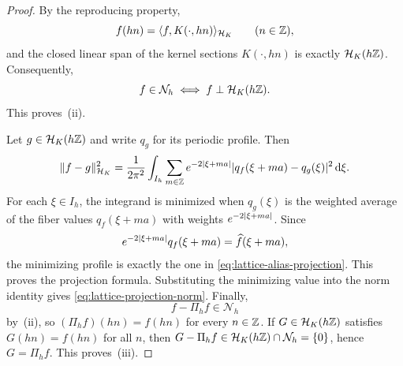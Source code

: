 \begin{proof}
By the reproducing property,
\[
f(hn)=\langle f,K(\cdot,hn)\rangle_{\mathcal H_K}
\qquad(n\in\mathbb{Z}),
\]
and the closed linear span of the kernel sections $K(\cdot,hn)$ is
exactly $\mathcal H_K(h\mathbb{Z})$.  Consequently,
\[
f\in\mathcal N_h
\iff
f\perp\mathcal H_K(h\mathbb{Z}).
\]
This proves~(ii).

Let $g\in\mathcal H_K(h\mathbb{Z})$ and write $q_g$ for its periodic profile.
Then
\[
\|f-g\|_{\mathcal H_K}^2
=\frac{1}{2\pi^2}\int_{I_h}
\sum_{m\in\mathbb{Z}}e^{-2\lvert \xi+ma\rvert}
\lvert q_f(\xi+ma)-q_g(\xi)\rvert^2\,\mathrm{d}\xi.
\]
For each $\xi\in I_h$, the integrand is minimized when $q_g(\xi)$ is the
weighted average of the fiber values $q_f(\xi+ma)$ with weights
$e^{-2\lvert \xi+ma\rvert}$.  Since
\[
e^{-2\lvert \xi+ma\rvert}q_f(\xi+ma)=\widehat f(\xi+ma),
\]
the minimizing profile is exactly the one in
\eqref{eq:lattice-alias-projection}.  This proves the projection formula.
Substituting the minimizing value into the norm identity gives
\eqref{eq:lattice-projection-norm}.  Finally,
\[
f-\Pi_hf\in\mathcal N_h
\]
by~(ii), so $(\Pi_hf)(hn)=f(hn)$ for every $n\in\mathbb{Z}$.  If
$G\in\mathcal H_K(h\mathbb{Z})$ satisfies $G(hn)=f(hn)$ for all $n$, then
$G-\Pi_hf\in\mathcal H_K(h\mathbb{Z})\cap\mathcal N_h=\{0\}$, hence
$G=\Pi_hf$.  This proves~(iii).
\end{proof}

